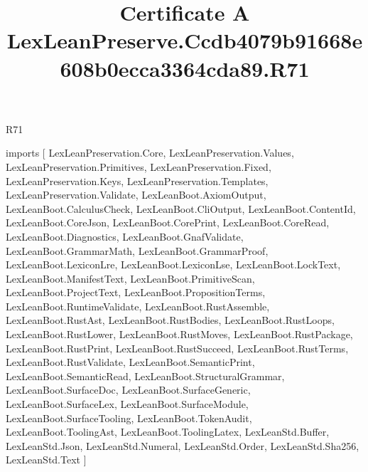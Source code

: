 \begin{lexlean}{R71}
\title{Certificate A LexLeanPreserve.Ccdb4079b91668e608b0ecca3364cda89.R71}
\begin{coremodule}
imports [
  LexLeanPreservation.Core,
  LexLeanPreservation.Values,
  LexLeanPreservation.Primitives,
  LexLeanPreservation.Fixed,
  LexLeanPreservation.Keys,
  LexLeanPreservation.Templates,
  LexLeanPreservation.Validate,
  LexLeanBoot.AxiomOutput,
  LexLeanBoot.CalculusCheck,
  LexLeanBoot.CliOutput,
  LexLeanBoot.ContentId,
  LexLeanBoot.CoreJson,
  LexLeanBoot.CorePrint,
  LexLeanBoot.CoreRead,
  LexLeanBoot.Diagnostics,
  LexLeanBoot.GnafValidate,
  LexLeanBoot.GrammarMath,
  LexLeanBoot.GrammarProof,
  LexLeanBoot.LexiconLre,
  LexLeanBoot.LexiconLse,
  LexLeanBoot.LockText,
  LexLeanBoot.ManifestText,
  LexLeanBoot.PrimitiveScan,
  LexLeanBoot.ProjectText,
  LexLeanBoot.PropositionTerms,
  LexLeanBoot.RuntimeValidate,
  LexLeanBoot.RustAssemble,
  LexLeanBoot.RustAst,
  LexLeanBoot.RustBodies,
  LexLeanBoot.RustLoops,
  LexLeanBoot.RustLower,
  LexLeanBoot.RustMoves,
  LexLeanBoot.RustPackage,
  LexLeanBoot.RustPrint,
  LexLeanBoot.RustSucceed,
  LexLeanBoot.RustTerms,
  LexLeanBoot.RustValidate,
  LexLeanBoot.SemanticPrint,
  LexLeanBoot.SemanticRead,
  LexLeanBoot.StructuralGrammar,
  LexLeanBoot.SurfaceDoc,
  LexLeanBoot.SurfaceGeneric,
  LexLeanBoot.SurfaceLex,
  LexLeanBoot.SurfaceModule,
  LexLeanBoot.SurfaceTooling,
  LexLeanBoot.TokenAudit,
  LexLeanBoot.ToolingAst,
  LexLeanBoot.ToolingLatex,
  LexLeanStd.Buffer,
  LexLeanStd.Json,
  LexLeanStd.Numeral,
  LexLeanStd.Order,
  LexLeanStd.Sha256,
  LexLeanStd.Text
]


\end{coremodule}
\end{lexlean}
